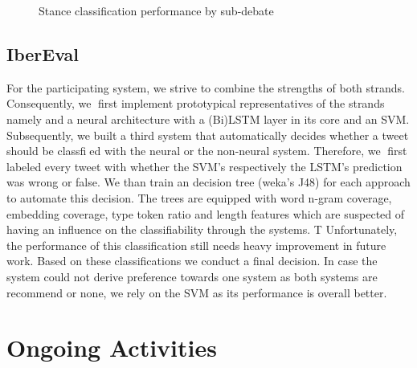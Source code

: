 \documentclass[11pt]{article}
\begin{document}
\begin{figure}[ht!]
	\vspace*{-4mm}
    \caption{Stance classification performance by sub-debate}
    \vspace*{-3mm}
\label{fig:performance_perSubtargets}
   \end{figure}

\subsection{IberEval}

For the participating system, we strive to combine the strengths of both strands. 
Consequently, we first implement prototypical representatives of the strands namely and a neural architecture with a (Bi)LSTM layer in its core and an SVM.
Subsequently, we built a third system that automatically decides whether a tweet should be classfied with the neural or the non-neural system. 
Therefore, we first labeled every tweet with whether the SVM's respectively the LSTM's prediction was wrong or false. 
We than train an decision tree (weka's J48) for each approach to automate this decision. 
The trees are equipped with word n-gram coverage, embedding coverage, type token ratio and length features which are suspected of having an influence on the classifiability through the systems. T
Unfortunately, the performance of this classification still needs heavy improvement in future work. 
Based on these classifications we conduct a final decision. 
In case the system could not derive preference towards one system as both systems are recommend or none, we rely on the SVM as its performance is overall better.

\section{Ongoing Activities}
\end{document}
